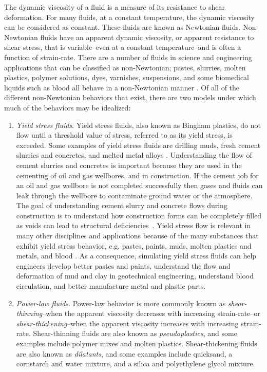 \documentclass{article}
\begin{document}
The dynamic viscosity of a fluid is a measure of its resistance to shear deformation.
For many fluids, at a constant temperature, the dynamic viscosity can be considered as constant.
These fluids are known as Newtonian fluids.
Non-Newtonian fluids have an apparent dynamic viscosity, or apparent resistance to shear stress, that is variable--even at a constant temperature--and is often a function of strain-rate.
There are a number of fluids in science and engineering applications that can be classified as non-Newtonian; pastes, slurries, molten plastics, polymer solutions, dyes, varnishes, suspensions, and some biomedical liquids such as blood all behave in a non-Newtonian manner \cite{bohme1987non}.
Of all of the different non-Newtonian behaviors that exist, there are two models under which much of the behaviors may be idealized:
\begin{enumerate}
	\item \emph{Yield stress fluids}. Yield stress fluids, also known as Bingham plastics, do not flow until a threshold value of stress, referred to as its yield stress, is exceeded.
	Some examples of yield stress fluids are drilling muds, fresh cement slurries and concretes, and melted metal alloys \cite{ginzburg2002free}.
	Understanding the flow of cement slurries and concretes is important because they are used in the cementing of oil and gas wellbores, and in construction.
	If the cement job for an oil and gas wellbore is not completed successfully then gases and fluids can leak through the wellbore to contaminate ground water or the atmosphere.
	The goal of understanding cement slurry and concrete flows during construction is to understand how construction forms can be completely filled as voids can lead to structural deficiencies~\cite{definitely cite someone}.
	Yield stress flow is relevant in many other disciplines and applications because of the many substances that exhibit yield stress behavior, e.g. pastes, paints, muds, molten plastics and metals, and blood \cite{wang2011lattice}. %
	As a consequence, simulating yield stress fluids can help engineers develop better pastes and paints, understand the flow and deformation of mud and clay in geotechnical engineering, understand blood circulation, and better manufacture metal and plastic parts.
	
	\item \emph{Power-law fluids}. Power-law behavior is more commonly known as \emph{shear-thinning}--when the apparent viscosity decreases with increasing strain-rate--or \emph{shear-thickening}--when the apparent viscosity increases with increasing strain-rate. Shear-thinning fluids are also known as \emph{pseudoplastics}, and some examples include polymer mixes and molten plastics.
	Shear-thickening fluids are also known as \emph{dilatants}, and some examples include quicksand, a cornstarch and water mixture, and a silica and polyethylene glycol mixture.
\end{enumerate} %
\end{document}
